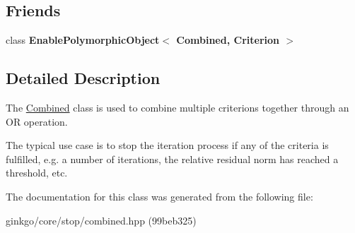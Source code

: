 \subsection*{Friends}
\begin{DoxyCompactItemize}
\item 
\mbox{\label{classgko_1_1stop_1_1Combined_a7c6977e97337814148e9c8ba5801ebf9}} 
class {\bfseries Enable\+Polymorphic\+Object$<$ Combined, Criterion $>$}
\end{DoxyCompactItemize}


\subsection{Detailed Description}
The \hyperlink{classgko_1_1stop_1_1Combined}{Combined} class is used to combine multiple criterions together through an OR operation. 

The typical use case is to stop the iteration process if any of the criteria is fulfilled, e.\+g. a number of iterations, the relative residual norm has reached a threshold, etc. 

The documentation for this class was generated from the following file\+:\begin{DoxyCompactItemize}
\item 
ginkgo/core/stop/combined.\+hpp (99beb325)\end{DoxyCompactItemize}
